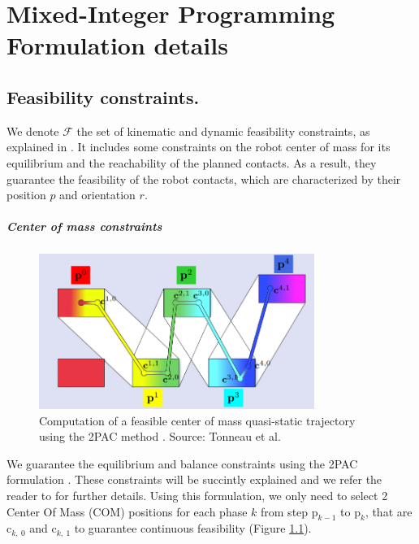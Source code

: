 \appendix

\chapter{Mixed-Integer Programming Formulation details}

\section{Feasibility constraints.\label{appendix:feasibility_constr}}
We denote $\mathcal{F}$ the set of kinematic and dynamic feasibility constraints, as explained in \cite{sl1m_v1}. 
It includes some constraints on the robot center of mass for its equilibrium and the reachability of the planned contacts.
As a result, they guarantee the feasibility of the robot contacts, which are characterized by their position $p$ and orientation $r$.

\paragraph{Center of mass constraints}
\begin{figure}[t]
    \centering
    \captionsetup[subfigure]{justification=centering}
    \includegraphics[width=0.8\textwidth]{Figures/Appendix/2pac_feasibility.png}
    \caption{Computation of a feasible center of mass quasi-static trajectory using the 2PAC method \cite{Tonneau2018_2PAC}. Source: Tonneau et al. \cite{sl1m_v1}}
    \label{fig:mip:feasibility_constr}
\end{figure}
We guarantee the equilibrium and balance constraints using the 2PAC formulation \cite{Tonneau2018_2PAC}.
These constraints will be succintly explained and we refer the reader to \cite{sl1m_v1} for further details.
Using this formulation, we only need to select 2 Center Of Mass (COM) positions for each phase $k$ from step $\mbox{p}_{k-1}$ to $\mbox{p}_k$, that are $\mbox{c}_{k,\:0}$ and $\mbox{c}_{k,\:1}$ to guarantee continuous feasibility (Figure \ref{fig:mip:feasibility_constr}).

